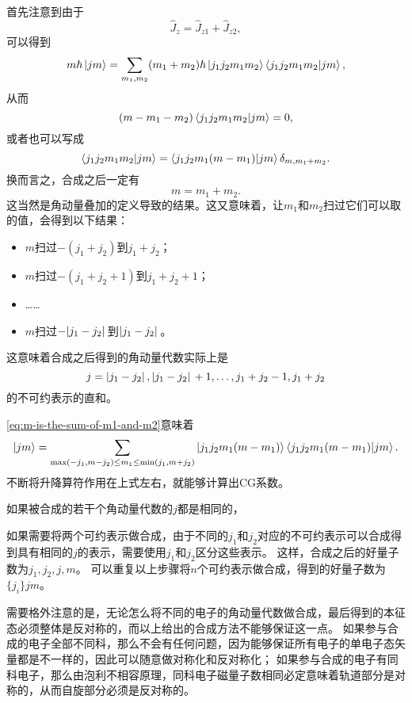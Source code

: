 首先注意到由于
\[
    \hat{J}_z = \hat{J}_{z1} + \hat{J}_{z2},
\]
可以得到
\[
    m \hbar \ket{jm} = \sum_{m_1, m_2} (m_1 + m_2) \hbar \ket{j_1 j_2 m_1 m_2} \braket{j_1 j_2 m_1 m_2}{j m}, 
\]
从而
\[
    (m - m_1 - m_2) \braket{j_1 j_2 m_1 m_2}{j m} = 0, 
\]
或者也可以写成
\begin{equation}
    \braket{j_1 j_2 m_1 m_2}{j m} = \braket{j_1 j_2 m_1 (m - m_1)}{j m} \delta_{m, m_1 + m_2}.
    \label{eq:m-is-the-sum-of-m1-and-m2}
\end{equation}
换而言之，合成之后一定有
\begin{equation}
    m = m_1 + m_2.
\end{equation}
这当然是角动量叠加的定义导致的结果。这又意味着，让$m_1$和$m_2$扫过它们可以取的值，会得到以下结果：
\begin{itemize}
    \item $m$扫过$-(j_1 + j_2)$到$j_1 + j_2$；
    \item $m$扫过$-(j_1 + j_2 + 1)$到$j_1 + j_2 + 1$；
    \item ……
    \item $m$扫过$-\abs*{j_1 - j_2}$到$\abs*{j_1 - j_2}$。
\end{itemize}
这意味着合成之后得到的角动量代数实际上是
\begin{equation}
    j = \abs*{j_1 - j_2}, \abs*{j_1 - j_2} + 1, \ldots, j_1 + j_2 - 1, j_1 + j_2
\end{equation}
的不可约表示的直和。

\eqref{eq:m-is-the-sum-of-m1-and-m2}意味着
\[
    \ket{jm} = \sum_{\max(-j_1, m-j_2) \leq m_1 \leq \min(j_1, m+j_2)} \ket{j_1 j_2 m_1 (m - m_1)} \braket{j_1 j_2 m_1 (m - m_1)}{jm}.
\]
不断将升降算符作用在上式左右，就能够计算出CG系数。

如果被合成的若干个角动量代数的$j$都是相同的，

如果需要将两个可约表示做合成，由于不同的$j_1$和$j_2$对应的不可约表示可以合成得到具有相同的$j$的表示，需要使用$j_1$和$j_2$区分这些表示。
这样，合成之后的好量子数为$j_1, j_2, j, m$。
可以重复以上步骤将$n$个可约表示做合成，得到的好量子数为$\{j_i\} j m$。

需要格外注意的是，无论怎么将不同的电子的角动量代数做合成，最后得到的本征态必须整体是反对称的，而以上给出的合成方法不能够保证这一点。
如果参与合成的电子全部不同科，那么不会有任何问题，因为能够保证所有电子的单电子态矢量都是不一样的，因此可以随意做对称化和反对称化；
如果参与合成的电子有同科电子，那么由泡利不相容原理，同科电子磁量子数相同必定意味着轨道部分是对称的，从而自旋部分必须是反对称的。

